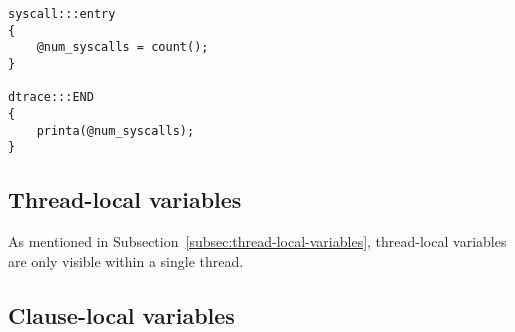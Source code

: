 \begin{verbatim}
syscall:::entry
{
    @num_syscalls = count();
}

dtrace:::END
{
    printa(@num_syscalls);
}
\end{verbatim}

\subsection{Thread-local variables}

As mentioned in Subsection~\ref{subsec:thread-local-variables}, thread-local
variables are only visible within a single thread.

\subsection{Clause-local variables}
